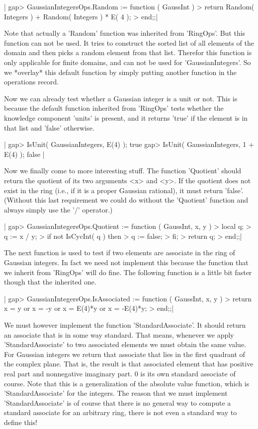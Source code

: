 |    gap> GaussianIntegersOps.Random := function ( GaussInt )
    >     return Random( Integers ) + Random( Integers ) * E( 4 );
    > end;;|

Note that actually a 'Random' function was inherited from 'RingOps'.  But
this function can not be used.  It tries to  construct the sorted list of
all  elements of the domain and then  picks  a  random element from  that
list.  Therefor this function is only applicable for finite domains,  and
can not  be  used for 'GaussianIntegers'.   So  we *overlay* this default
function by simply putting another function in the operations record.

Now we can  already test whether a Gaussian integer  is  a unit  or  not.
This  is  because the  default function  inherited  from 'RingOps'  tests
whether the knowledge component 'units' is present, and it returns 'true'
if the element is in that list and 'false' otherwise.

|    gap> IsUnit( GaussianIntegers, E(4) );
    true
    gap> IsUnit( GaussianIntegers, 1 + E(4) );
    false |

Now we finally  come to more  interesting stuff.  The function 'Quotient'
should  return  the  quotient of  its two  arguments <x> and <y>.  If the
quotient does not  exist  in  the ring (i.e.,  if it is a proper Gaussian
rational),  it must return 'false'.   (Without this last  requirement  we
could do  without the 'Quotient' function and  always simply  use the '/'
operator.)

|    gap> GaussianIntegersOps.Quotient := function ( GaussInt, x, y )
    >     local   q;
    >     q := x / y;
    >     if not IsCycInt( q )  then
    >         q := false;
    >     fi;
    >     return q;
    > end;;|

The  next  function is used to test  if two elements are associate in the
ring of Gaussian integers.   In  fact we need not  implement this because
the function that we inherit  from 'RingOps' will do fine.  The following
function is a little bit faster though that the inherited one.

|    gap> GaussianIntegersOps.IsAssociated := function ( GaussInt, x, y )
    >     return x = y  or x = -y  or x = E(4)*y  or x = -E(4)*y;
    > end;;|

We must however  implement the  function 'StandardAssociate'.   It should
return an associate that is in some  way standard.  That means,  whenever
we  apply 'StandardAssociate' to two  associated elements  we must obtain
the same value.  For Gaussian integers we return that associate that lies
in the first quadrant of the complex plane.  That is,  the result is that
associated element that has positive real part and  nonnegative imaginary
part.  0 is its  own standard associate  of course.  Note  that this is a
generalization    of    the   absolute    value    function,   which   is
'StandardAssociate'  for the integers.  The reason that we must implement
'StandardAssociate' is of  course that there is no general way to compute
a standard associate for an arbitrary ring, there is  not even a standard
way to define this!

